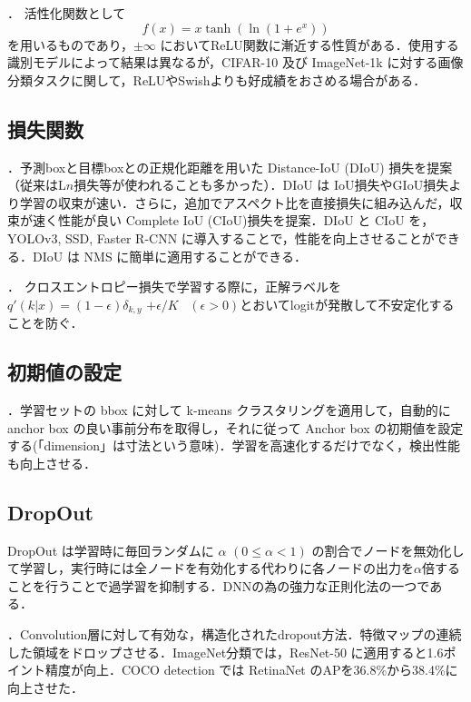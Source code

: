 \documentclass[originalpaper,fleqn]{jsaiart}     %
\begin{document}
\cite{Misra20}．
活性化関数として $$f(x) = x \tanh(\ln(1 + e^x))$$ を用いるものであり，$\pm\infty$ においてReLU関数に漸近する性質がある．使用する識別モデルによって結果は異なるが，CIFAR-10 及び ImageNet-1k に対する画像分類タスクに関して，ReLUやSwish\cite{RZL18}よりも好成績をおさめる場合がある．

\subsection{損失関数}
 \cite{ZWLLYR20}．予測boxと目標boxとの正規化距離を用いた Distance-IoU (DIoU) 損失を提案（従来はL$n$損失等が使われることも多かった）．DIoU は IoU損失やGIoU損失より学習の収束が速い．さらに，追加でアスペクト比を直接損失に組み込んだ，収束が速く性能が良い Complete IoU (CIoU)損失を提案．DIoU と CIoU を，YOLOv3, SSD, Faster R-CNN に導入することで，性能を向上させることができる．DIoU は NMS に簡単に適用することができる．

 \cite{SVISW16}．
クロスエントロピー損失で学習する際に，正解ラベルを $q'(k|x){=}(1{-}\epsilon)\delta_{k,y}$ 
${+}\epsilon/K$ \ $(\epsilon{>}0)$とおいてlogitが発散して不安定化することを防ぐ．

\subsection{初期値の設定}
 \cite{RedFar17}．学習セットの bbox に対して k-means クラスタリングを適用して，自動的に anchor box の良い事前分布を取得し，それに従って Anchor box の初期値を設定する(「dimension」は寸法という意味)．学習を高速化するだけでなく，検出性能も向上させる．

\subsection{DropOut}
DropOut\cite{SHKSS14} は学習時に毎回ランダムに $\alpha$ $(0\leq\alpha<1)$ の割合でノードを無効化して学習し，実行時には全ノードを有効化する代わりに各ノードの出力を$\alpha$倍することを行うことで過学習を抑制する．DNNの為の強力な正則化法の一つである．

 \cite{GLL18}．Convolution層に対して有効な，構造化されたdropout方法．特徴マップの連続した領域をドロップさせる．ImageNet分類では，ResNet-50 に適用すると1.6ポイント精度が向上．COCO detection では RetinaNet のAPを36.8\%から38.4\%に向上させた．
\end{document}
